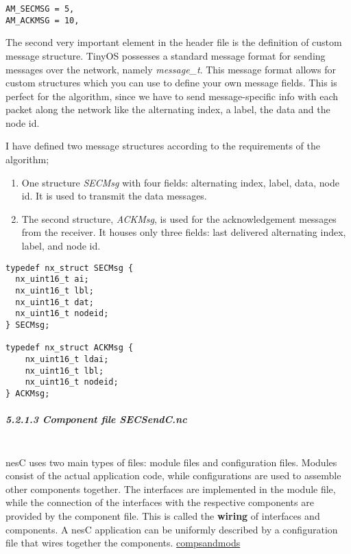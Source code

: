 \begin{verbatim}
AM_SECMSG = 5,
AM_ACKMSG = 10,
\end{verbatim}

The second very important element in the header file is the definition
of custom message structure. TinyOS possesses a standard message format
for sending messages over the network, namely \emph{message\_t}. This
message format allows for custom structures which you can use to define
your own message fields. This is perfect for the algorithm, since we
have to send message-specific info with each packet along the network
like the alternating index, a label, the data and the node id.

I have defined two message structures according to the requirements of
the algorithm;

\begin{enumerate}
\def\labelenumi{\arabic{enumi}.}
\itemsep1pt\parskip0pt
\item
  One structure \emph{SECMsg} with four fields: alternating index,
  label, data, node id. It is used to transmit the data messages.
\item
  The second structure, \emph{ACKMsg}, is used for the acknowledgement
  messages from the receiver. It houses only three fields: last
  delivered alternating index, label, and node id.
\end{enumerate}

\begin{verbatim}
typedef nx_struct SECMsg {
  nx_uint16_t ai;
  nx_uint16_t lbl;
  nx_uint16_t dat;
  nx_uint16_t nodeid;
} SECMsg;

typedef nx_struct ACKMsg {
    nx_uint16_t ldai;
    nx_uint16_t lbl;
    nx_uint16_t nodeid;
} ACKMsg;
\end{verbatim}

\subparagraph{5.2.1.3 Component file
\emph{SECSendC.nc}\\\\}\label{component-file-secsendc.nc}

nesC uses two main types of files: module files and configuration files.
Modules consist of the actual application code, while configurations are
used to assemble other components together. The interfaces are
implemented in the module file, while the connection of the interfaces
with the respective components are provided by the component file. This
is called the \textbf{wiring} of interfaces and components. A nesC
application can be uniformly described by a configuration file that
wires together the components.
\href{http://www.tinyos.net/tinyos-1.x/doc/tutorial/lesson1.html}{compsandmods}

